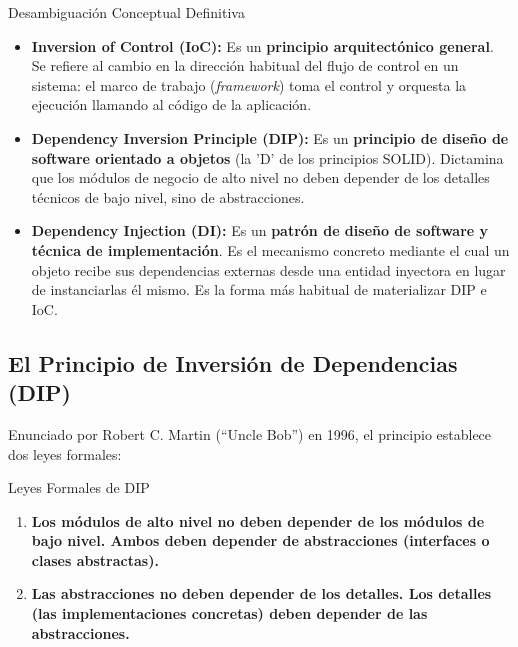 \begin{definicion}{Desambiguación Conceptual Definitiva}
\begin{itemize}[leftmargin=1.5em]
  \item \textbf{Inversion of Control (IoC):} Es un \textbf{principio arquitectónico general}. Se refiere al cambio en la dirección habitual del flujo de control en un sistema: el marco de trabajo (\emph{framework}) toma el control y orquesta la ejecución llamando al código de la aplicación.
  \item \textbf{Dependency Inversion Principle (DIP):} Es un \textbf{principio de diseño de software orientado a objetos} (la 'D' de los principios SOLID). Dictamina que los módulos de negocio de alto nivel no deben depender de los detalles técnicos de bajo nivel, sino de abstracciones.
  \item \textbf{Dependency Injection (DI):} Es un \textbf{patrón de diseño de software y técnica de implementación}. Es el mecanismo concreto mediante el cual un objeto recibe sus dependencias externas desde una entidad inyectora en lugar de instanciarlas él mismo. Es la forma más habitual de materializar DIP e IoC.
\end{itemize}
\end{definicion}

\subsection{El Principio de Inversión de Dependencias (DIP)}

Enunciado por Robert C. Martin (``Uncle Bob'') en 1996, el principio establece dos leyes formales:

\begin{definicion}{Leyes Formales de DIP}
\begin{enumerate}
  \item \textbf{Los módulos de alto nivel no deben depender de los módulos de bajo nivel. Ambos deben depender de abstracciones (interfaces o clases abstractas).}
  \item \textbf{Las abstracciones no deben depender de los detalles. Los detalles (las implementaciones concretas) deben depender de las abstracciones.}
\end{enumerate}
\end{definicion}


